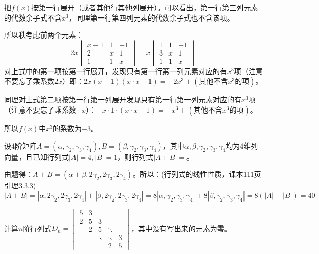 \documentclass[a4paper]{report}
\begin{document}
\begin{jie}
把$f(x)$按第一行展开（或者其他行其他列展开）。可以看出，第一行第三列元素的代数余子式不含$x^3$，同理第一行第四列元素的代数余子式也不含该项。

所以秩考虑前两个元素：
\begin{equation*}
2x\begin{vmatrix}
x-1&1&-1\\
2&x&1\\
1&1&x
\end{vmatrix}-x\begin{vmatrix}
1&1&-1\\
3&x&1\\
1&1&x
\end{vmatrix}
\end{equation*}
对上式中的第一项按第一行展开，发现只有第一行第一列元素对应的有$x^3$项（注意不要忘了乘系数$2x$）即：$2x(x-1)(x\cdot x-1)=-2x^{3}+(\text{其他不含$x^3$的项})$。

同理对上式第二项按第一行第一列展开发现只有第一行第一列元素对应的有$x^3$项（注意不要忘了乘系数$-x$）：$-x\cdot 1\cdot(x\cdot x-1)=-x^3+(\text{其他不含$x^3$的项})$。

所以$f(x)$中$x^3$的系数为$-3$。
\end{jie}

\EX 设$4$阶矩阵$A=(\alpha,\gamma_2,\gamma_3,\gamma_4),B=(\beta,\gamma_2,\gamma_3,\gamma_4)$，其中$\alpha,\beta,\gamma_2,\gamma_3,\gamma_4$均为$4$维列向量，且已知行列式$|A|=4,|B|=1$，则行列式$|A+B|=$\underline{\hphantom{~~~~~~~~~~~~}}。

\begin{jie}
由题得：$A+B=(\alpha+\beta,2\gamma_2,2\gamma_3,2\gamma_4)$。所以：(行列式的线性性质，课本111页引理3.3.3)
\begin{equation*}
|A+B|=|\alpha,2\gamma_2,2\gamma_3,2\gamma_4|+|\beta,2\gamma_2,2\gamma_3,2\gamma_4|=8|\alpha,\gamma_2,\gamma_3,\gamma_4|+8|\beta,\gamma_2,\gamma_3,\gamma_4|=8(|A|+|B|)=40
\end{equation*}
\end{jie}

\EX 计算$n$阶行列式$
D_n=
\begin{vmatrix}
5&3&&&\\
2&5&3&&\\
&2&5&\ddots&\\
&&\ddots&\ddots&3\\
&&&2&5
\end{vmatrix}
$，其中没有写出来的元素为零。
\end{document}

